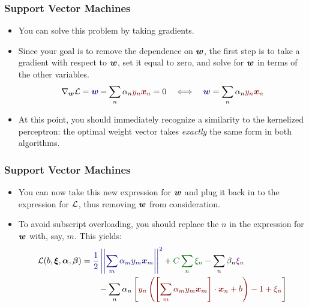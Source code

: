 \documentclass[trans]{beamer}
\begin{document}
\begin{frame}
  \frametitle{Support Vector Machines}
\begin{itemize}
\item 
You can solve this problem by taking gradients.  
\item  Since your goal is to remove the dependence on ${\boldsymbol{w}}$, the
first step is to take a gradient with respect to ${\boldsymbol{w}}$, set it equal
to zero, and solve for ${\boldsymbol{w}}$ in terms of the other variables.
%
\begin{align}
\grad_{\vw} \cL
= \textcolor{darkblue}{\vw} 
  - \sum_n \al_n \textcolor{darkred}{y_n \vx_n}
= 0 \quad\Longleftrightarrow\quad
\textcolor{darkblue}{\vw} 
= \sum_n \al_n \textcolor{darkred}{y_n \vx_n}
\end{align}
%
\item
At this point, you should immediately recognize a similarity to the
kernelized perceptron: the optimal weight vector takes \emph{exactly}
the same form in both algorithms.
\end{itemize}
\end{frame}

\begin{frame}
  \frametitle{Support Vector Machines}
\begin{itemize}
\item 
You can now take this new expression for ${\boldsymbol{w}}$ and plug it back in to
the expression for $\mathcal{L}$, thus removing ${\boldsymbol{w}}$ from consideration.  
\item To
avoid subscript overloading, you should replace the $n$ in the
expression for ${\boldsymbol{w}}$ with, say, $m$.  This yields:
%
\begin{align}
\cL(b,\vec\xi,\vec\al,\vec\be)
&= 
  \textcolor{darkblue}{\frac 1 2 \norm{\sum_m \al_m y_m \vx_m}^2}
+ \textcolor{darkergreen}{C \sum_n \xi_n}
- \sum_n \be_n \textcolor{darkpurple}{\xi_n}
\\&\qquad
- \sum_n \al_n \left[
    \textcolor{darkred}{y_n \left( \dotp{\left[ \sum_m \al_m y_m \vx_m\right]}{\vx_n} + b \right) - 1 + \xi_n}
  \right]
\end{align}
%
\end{itemize}
\end{frame}
\end{document}

